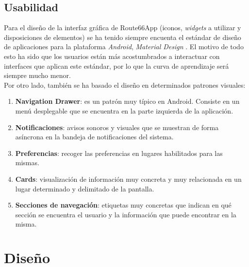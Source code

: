 \documentclass[twoside]{report}
\begin{document}
\subsection{Usabilidad}
\label{usabilitymatters}

Para el diseño de la interfaz gráfica de Route66App (iconos, \textit{widgets} a utilizar y disposiciones de elementos) se ha tenido siempre encuenta el estándar de diseño de aplicaciones para la plataforma \textit{Android}, 	\textit{Material Design} \cite{materialil} \cite{materialdocs}. El motivo de todo esto ha sido que los usuarios están más acostumbrados a interactuar con interfaces que aplican este estándar, por lo que la curva de aprendizaje será siempre mucho menor. \\

Por otro lado, también se ha basado el diseño en determinados patrones visuales:
\begin{enumerate}
	\item \textbf{Navigation Drawer}: es un patrón muy típico en Android. Consiste en un menú desplegable que se encuentra en la parte izquierda de la aplicación.
	\item \textbf{Notificaciones}: avisos sonoros y visuales que se muestran de forma asíncrona en la bandeja de notificaciones del sistema.
	\item \textbf{Preferencias}: recoger las preferencias en lugares habilitados para las mismas.
	\item \textbf{Cards}: visualización de información muy concreta y muy relacionada en un lugar determinado y delimitado de la pantalla.
	\item \textbf{Secciones de navegación}: etiquetas muy concretas que indican en qué sección se encuentra el usuario y la información que puede encontrar en la misma.
\end{enumerate}


\section{Diseño}
\end{document}

